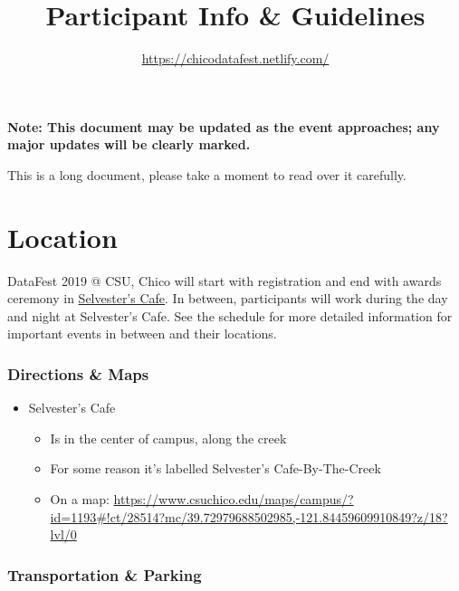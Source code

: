 \documentclass[]{article}
\title{Participant Info \& Guidelines}
\subtitle{\url{https://chicodatafest.netlify.com/}}
\author{}
\date{}
\providecommand{\tightlist}{%
  \setlength{\itemsep}{0pt}\setlength{\parskip}{0pt}}
\begin{document}
\maketitle

\textbf{Note: This document may be updated as the event approaches; any
major updates will be clearly marked.}

This is a long document, please take a moment to read over it carefully.

\hypertarget{location}{%
\section{Location}\label{location}}

DataFest 2019 @ CSU, Chico will start with registration and end with
awards ceremony in
\href{https://www.csuchico.edu/aaspace/commonspaces/selv/index.shtml}{Selvester's
Cafe}. In between, participants will work during the day and night at
Selvester's Cafe. See the schedule for more detailed information for
important events in between and their locations.

\hypertarget{directions-maps}{%
\subsubsection{Directions \& Maps}\label{directions-maps}}

\begin{itemize}
\tightlist
\item
  Selvester's Cafe

  \begin{itemize}
  \tightlist
  \item
    Is in the center of campus, along the creek
  \item
    For some reason it's labelled Selvester's Cafe-By-The-Creek
  \item
    On a map:
    \url{https://www.csuchico.edu/maps/campus/?id=1193\#!ct/28514?mc/39.72979688502985,-121.84459609910849?z/18?lvl/0}
  \end{itemize}
\end{itemize}

\hypertarget{transportation-parking}{%
\subsubsection{Transportation \& Parking}\label{transportation-parking}}
\end{document}
